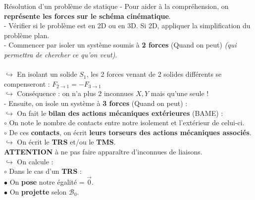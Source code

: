 \documentclass{article} %
\begin{document}
{\begin{méthode}[label=méthodoPFS]{Résolution d'un problème de statique}
- Pour aider à la compréhension, on \textbf{représente les forces sur le schéma cinématique}.\\
- Vérifier si le problème est en 2D ou en 3D.
Si 2D, appliquer la simplification du problème plan.\\
- Commencer par isoler un système soumis à \textbf{2 forces} (Quand on peut) \textit{(qui permettra de chercher ce qu'on veut)}.\\
\\
\hspace*{15pt} $\hookrightarrow$ En isolant un solide $S_1$, les 2 forces venant de 2 solides différents se compenseront : $F_{2\to 1}=-F_{3 \to 1}$\\
\hspace*{15pt} $\hookrightarrow$ Conséquence : on n'a plus 2 inconnues $X,Y$ mais qu'une seule !\\
- Ensuite, on isole un système à \textbf{3 forces} (Quand on peut) :\\
\hspace*{15pt} $\hookrightarrow$ On fait le \textbf{bilan des actions 
mécaniques extérieures} (BAME) :\\
\hspace*{30pt} $\circ$ On note le nombre de contacts entre notre isolement et l'extérieur de celui-ci.\\
\hspace*{30pt} $\circ$ De ces \textbf{contacts}, on écrit \textbf{leurs torseurs des actions mécaniques associés}.\\
\hspace*{15pt} $\hookrightarrow$ On écrit le \textbf{TRS} et/ou le \textbf{TMS}.\\
\hspace*{30pt} {\footnotesize \textbf{ATTENTION} à ne pas faire apparaître d'inconnues de liaisons.}\\
\hspace*{15pt} $\hookrightarrow$ On calcule :\\
\hspace*{30pt} $\circ$ Dans le cas d'un \textbf{TRS} :\\
\hspace*{45pt} $\bullet$ On \textbf{pose} notre égalité = $\overrightarrow{0}$.\\
\hspace*{45pt} $\bullet$ On \textbf{projette} selon $\mathcal{B}_0$.\\

\end{méthode}}
\end{document}
